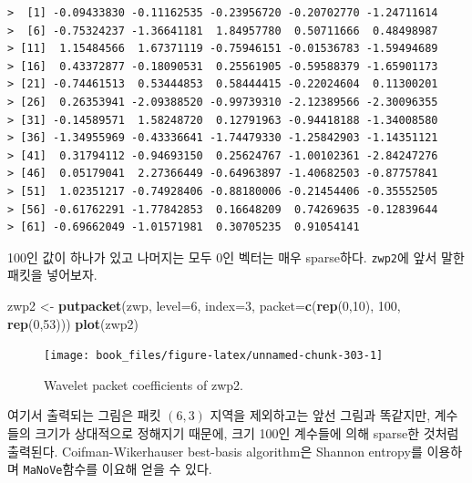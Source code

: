 \documentclass[b5paper,]{scrbook}
\makeatletter
\newenvironment{Shaded}{\begin{snugshade}}{\end{snugshade}}
\newcommand{\DataTypeTok}[1]{\textcolor[rgb]{0.13,0.29,0.53}{#1}}
\newcommand{\DecValTok}[1]{\textcolor[rgb]{0.00,0.00,0.81}{#1}}
\newcommand{\KeywordTok}[1]{\textcolor[rgb]{0.13,0.29,0.53}{\textbf{#1}}}
\newcommand{\NormalTok}[1]{#1}
\newcommand{\StringTok}[1]{\textcolor[rgb]{0.31,0.60,0.02}{#1}}
\theoremstyle{plain}
\theoremstyle{definition}
\numberwithin{equation}{section}
\newenvironment{kframe}{%
\medskip{}
\setlength{\fboxsep}{.8em}
 \def\at@end@of@kframe{}%
 \ifinner\ifhmode%
  \def\at@end@of@kframe{\end{minipage}}%
  \begin{minipage}{\columnwidth}%
 \fi\fi%
 \def\FrameCommand##1{\hskip\@totalleftmargin \hskip-\fboxsep
 \colorbox{shadecolor}{##1}\hskip-\fboxsep
     \hskip-\linewidth \hskip-\@totalleftmargin \hskip\columnwidth}%
 \MakeFramed {\advance\hsize-\width
   \@totalleftmargin\z@ \linewidth\hsize
   \@setminipage}}%
 {\par\unskip\endMakeFramed%
 \at@end@of@kframe}
\renewenvironment{Shaded}{\begin{kframe}}{\end{kframe}}
\makeatother
\begin{document}
\begin{verbatim}
>  [1] -0.09433830 -0.11162535 -0.23956720 -0.20702770 -1.24711614
>  [6] -0.75324237 -1.36641181  1.84957780  0.50711666  0.48498987
> [11]  1.15484566  1.67371119 -0.75946151 -0.01536783 -1.59494689
> [16]  0.43372877 -0.18090531  0.25561905 -0.59588379 -1.65901173
> [21] -0.74461513  0.53444853  0.58444415 -0.22024604  0.11300201
> [26]  0.26353941 -2.09388520 -0.99739310 -2.12389566 -2.30096355
> [31] -0.14589571  1.58248720  0.12791963 -0.94418188 -1.34008580
> [36] -1.34955969 -0.43336641 -1.74479330 -1.25842903 -1.14351121
> [41]  0.31794112 -0.94693150  0.25624767 -1.00102361 -2.84247276
> [46]  0.05179041  2.27366449 -0.64963897 -1.40682503 -0.87757841
> [51]  1.02351217 -0.74928406 -0.88180006 -0.21454406 -0.35552505
> [56] -0.61762291 -1.77842853  0.16648209  0.74269635 -0.12839644
> [61] -0.69662049 -1.01571981  0.30705235  0.91054141
\end{verbatim}

100인 값이 하나가 있고 나머지는 모두 0인 벡터는 매우 sparse하다. \texttt{zwp2}에 앞서 말한 패킷을 넣어보자.

\begin{Shaded}
\begin{Highlighting}[]
\NormalTok{zwp2 <-}\StringTok{ }\KeywordTok{putpacket}\NormalTok{(zwp, }\DataTypeTok{level=}\DecValTok{6}\NormalTok{, }\DataTypeTok{index=}\DecValTok{3}\NormalTok{, }\DataTypeTok{packet=}\KeywordTok{c}\NormalTok{(}\KeywordTok{rep}\NormalTok{(}\DecValTok{0}\NormalTok{,}\DecValTok{10}\NormalTok{), }\DecValTok{100}\NormalTok{, }\KeywordTok{rep}\NormalTok{(}\DecValTok{0}\NormalTok{,}\DecValTok{53}\NormalTok{)))}
\KeywordTok{plot}\NormalTok{(zwp2)}
\end{Highlighting}
\end{Shaded}

\begin{figure}

{\centering \texttt{[image: book\_files/figure-latex/unnamed-chunk-303-1]} 

}

\caption{Wavelet packet coefficients of zwp2.}\label{fig:unnamed-chunk-303}
\end{figure}

여기서 출력되는 그림은 패킷 \((6,3)\) 지역을 제외하고는 앞선 그림과 똑같지만, 계수들의 크기가 상대적으로 정해지기 때문에, 크기 100인 계수들에 의해 sparse한 것처럼 출력된다. Coifman-Wikerhauser best-basis algorithm은 Shannon entropy를 이용하며 \texttt{MaNoVe}함수를 이요해 얻을 수 있다.
\end{document}
